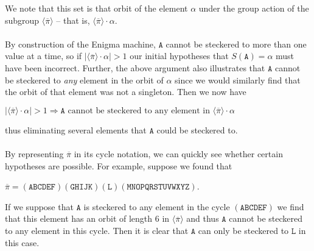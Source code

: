 We note that this set is that orbit of the element $\alpha$ under the
group action of the subgroup $\langle\overline{\pi}\rangle$ -- that is,
$\langle\overline{\pi}\rangle\cdot\alpha$.
\\\\By construction of the Enigma machine, $\texttt{A}$ cannot be steckered to
more than one value at a time, so if
$|\langle\overline{\pi}\rangle\cdot\alpha| > 1$ our initial
hypotheses that $S(\texttt{A}) = \alpha$ must have been incorrect. Further,
the above argument also illustrates that $\texttt{A}$ cannot be steckered to
\emph{any} element in the orbit of $\alpha$ since
we would similarly find that the orbit of that element was not a
singleton. Then we now have
\begin{center}
  $|\langle\overline{\pi}\rangle\cdot\alpha| > 1 \Rightarrow
  \texttt{A} \text{ cannot be steckered to any element in
  }\langle\overline{\pi}\rangle\cdot\alpha$
\end{center}
thus eliminating several elements that $\texttt{A}$ could be steckered to.
\\\\By representing $\overline\pi$ in its cycle notation, we can
quickly see whether certain hypotheses are possible. For example,
suppose we found that
\begin{center}
  $\overline\pi =
  (\texttt{ABCDEF})(\texttt{GHIJK})(\texttt{L})(\texttt{MNOPQRSTUVWXYZ})$.
\end{center}
If we suppose that $\texttt{A}$ is steckered to any element in the cycle
$(\texttt{ABCDEF})$ we find that this
element has an orbit of length $6$ in $\langle\overline\pi\rangle$
and thus $\texttt{A}$ cannot be steckered
to any element in this cycle. Then it is clear that $\texttt{A}$ can only be
steckered to $\texttt{L}$ in this case.

